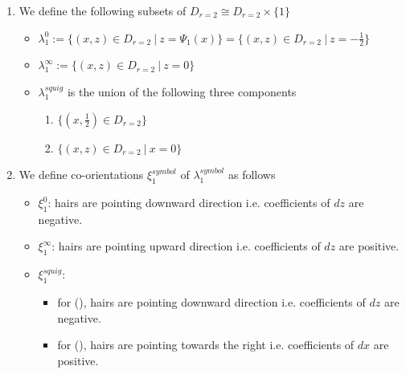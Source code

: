\begin{definition}
\begin{enumerate}
\item We define the following subsets of $D_{r=2} \cong D_{r=2}\times \{1\}$
\begin{itemize}
\item $\lambda_1^0 := \{(x,z) \in D_{r=2} ~|~ z = \Psi_1(x)\} = \{(x,z) \in D_{r=2} ~|~ z = -\frac{1}{2}\}$

\item $\lambda_1^\infty := \{(x,z) \in D_{r=2} ~|~ z = 0 \}$

\item $\lambda_1^{squig}$ is the union of the following three components
\begin{enumerate}[label=(\roman*)]

\item $\{(x,\frac{1}{2}) \in D_{r=2} \}$

\item $\{(x,z) \in D_{r=2} ~|~ x=0\}$
\end{enumerate}
\end{itemize}

\item We define co-orientations $\xi_1^{symbol}$ of $\lambda_1^{symbol}$ as follows
\begin{itemize}
\item $\xi_1^0$: hairs are pointing downward direction i.e. coefficients of $dz$ are negative.

\item $\xi_1^\infty$: hairs are pointing upward direction i.e. coefficients of $dz$ are positive.

\item $\xi_1^{squig}$: 
\begin{itemize}
\item for (), hairs are pointing downward direction i.e. coefficients of $dz$ are negative.
\item for (), hairs are pointing towards the right i.e. coefficients of $dx$ are positive.
\end{itemize}
\end{itemize}
\end{enumerate}
\end{definition}

